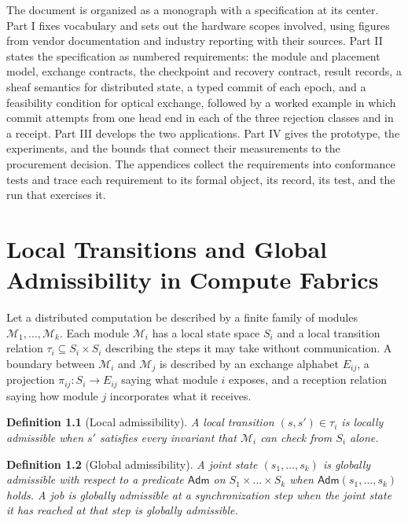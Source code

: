 \documentclass[11pt,openany]{book}
\newtheorem{definition}{Definition}[chapter]
\theoremstyle{remark}
\newcommand{\Mod}{\mathcal{M}}
\newcommand{\Adm}{\mathsf{Adm}}
\begin{document}
The document is organized as a monograph with a specification at its center. Part I fixes vocabulary and sets out the hardware scopes involved, using figures from vendor documentation and industry reporting with their sources. Part II states the specification as numbered requirements: the module and placement model, exchange contracts, the checkpoint and recovery contract, result records, a sheaf semantics for distributed state, a typed commit of each epoch, and a feasibility condition for optical exchange, followed by a worked example in which commit attempts from one head end in each of the three rejection classes and in a receipt. Part III develops the two applications. Part IV gives the prototype, the experiments, and the bounds that connect their measurements to the procurement decision. The appendices collect the requirements into conformance tests and trace each requirement to its formal object, its record, its test, and the run that exercises it.

\chapter[Local Transitions and Global Admissibility]{Local Transitions and Global Admissibility in Compute Fabrics}

Let a distributed computation be described by a finite family of modules $\Mod_1,\dots,\Mod_k$. Each module $\Mod_i$ has a local state space $S_i$ and a local transition relation $\tau_i \subseteq S_i \times S_i$ describing the steps it may take without communication. A boundary between $\Mod_i$ and $\Mod_j$ is described by an exchange alphabet $E_{ij}$, a projection $\pi_{ij}\colon S_i \to E_{ij}$ saying what module $i$ exposes, and a reception relation saying how module $j$ incorporates what it receives.

\begin{definition}[Local admissibility]
A local transition $(s,s')\in\tau_i$ is locally admissible when $s'$ satisfies every invariant that $\Mod_i$ can check from $S_i$ alone.
\end{definition}

\begin{definition}[Global admissibility]
A joint state $(s_1,\dots,s_k)$ is globally admissible with respect to a predicate $\Adm$ on $S_1\times\dots\times S_k$ when $\Adm(s_1,\dots,s_k)$ holds. A job is globally admissible at a synchronization step when the joint state it has reached at that step is globally admissible.
\end{definition}
\end{document}

